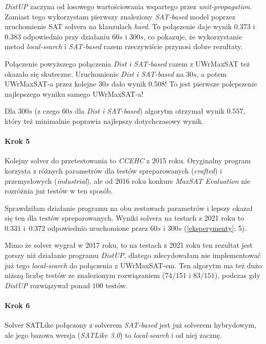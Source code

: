 \documentclass[shortabstract]{iithesis}
\begin{document}
\textit{DistUP} zaczyna od losowego wartościowania wspartego przez \textit{unit-propagation}. Zamiast tego wykorzystam pierwszy znaleziony \textit{SAT-based} model poprzez uruchomienie SAT solvera na klauzulach \textit{hard}. To połączenie daje wynik $0.373$ i $0.383$ odpowiednio przy działaniu $60s$ i $300s$, co pokazuje, że wykorzystanie metod \textit{local-search} i \textit{SAT-based} razem rzeczywiście przynosi dobre rezultaty.

Połączenie powyższego połączenia \textit{Dist i SAT-based} razem z UWrMaxSAT też okazało się skuteczne. Uruchomienie \textit{Dist i SAT-based} na $30s$, a potem UWrMaxSAT-a przez kolejne $30s$ dało wynik $0.508$! To jest pierwsze polepszenie najlepszego wyniku samego UWrMaxSAT-a!

Dla $300s$ (z czego $60s$ dla \textit{Dist i SAT-based}) algorytm otrzymał wynik $0.557$, który też minimalnie poprawia najlepszy dotychczasowy wynik. 

\paragraph{Krok 5} Kolejny solver do przetestowania to \textit{CCEHC} z 2015 roku. Oryginalny program korzysta z różnych parametrów dla testów spreparowanych (\textit{crafted}) i przemysłowych (\textit{industrial}), ale od 2016 roku konkurs \textit{MaxSAT Evaluation} nie rozróżnia już testów w ten sposób. 

Sprawdziłam działanie programu na obu zestawach parametrów i lepszy okazał się ten dla testów spreparowanych. Wyniki solvera na testach z 2021 roku to $0.331$ i~$0.372$ odpowiednio uruchomione przez $60s$ i $300s$ (\ref{eksperymenty}: 5). 

Mimo że solver wygrał w 2017 roku, to na testach z 2021 roku ten rezultat jest gorszy niż działanie programu \textit{DistUP}, dlatego zdecydowałam nie implementować już tego \textit{local-search} do połączenia z UWrMaxSAT-em.
Ten algorytm ma też dużo niższą liczbę testów ze znalezionym rozwiązaniem ($74/151$ i $83/151$), podczas gdy \textit{DistUP} rozwiązywał ponad $100$ testów.

\paragraph{Krok 6} Solver SATLike połączony z solverem \textit{SAT-based} jest już solverem hybrydowym, ale jego bazowa wersja (\textit{SATLike 3.0}) to \textit{local-search} i od niej zacznę.
\end{document}
